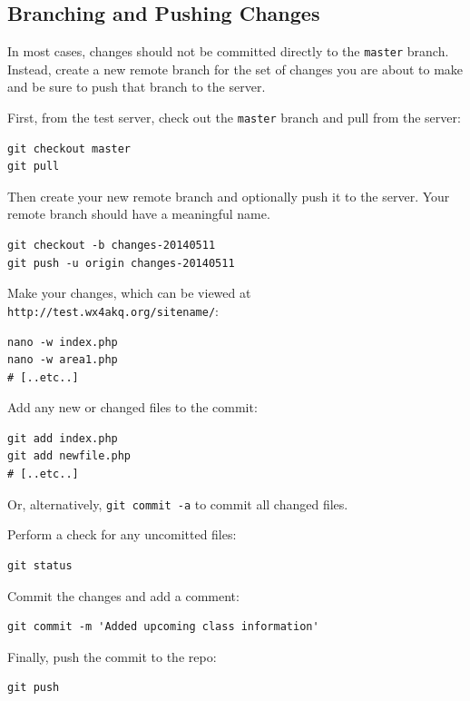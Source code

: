 \documentclass[pdflatex,letterpaper,twoside,12pt]{book}
\begin{document}
\subsection{Branching and Pushing Changes}

In most cases, changes should not be committed directly to the \texttt{master} branch.  Instead, create a new remote branch for the set of changes you are about to make and be sure to push that branch to the server.

First, from the test server, check out the \texttt{master} branch and pull from the server:

\begin{lstlisting}
git checkout master
git pull
\end{lstlisting}

Then create your new remote branch and optionally push it to the server.  Your remote branch should have a meaningful name.

\begin{lstlisting}
git checkout -b changes-20140511
git push -u origin changes-20140511
\end{lstlisting}

Make your changes, which can be viewed at \texttt{http://test.wx4akq.org/sitename/}:

\begin{lstlisting}
nano -w index.php
nano -w area1.php
# [..etc..]
\end{lstlisting}

Add any new or changed files to the commit:

\begin{lstlisting}
git add index.php
git add newfile.php
# [..etc..]
\end{lstlisting}

Or, alternatively, \lstinline!git commit -a! to commit all changed files.

Perform a check for any uncomitted files:

\begin{lstlisting}
git status
\end{lstlisting}

Commit the changes and add a comment:

\begin{lstlisting}
git commit -m 'Added upcoming class information'
\end{lstlisting}

Finally, push the commit to the repo:

\begin{lstlisting}
git push
\end{lstlisting}
\end{document}
